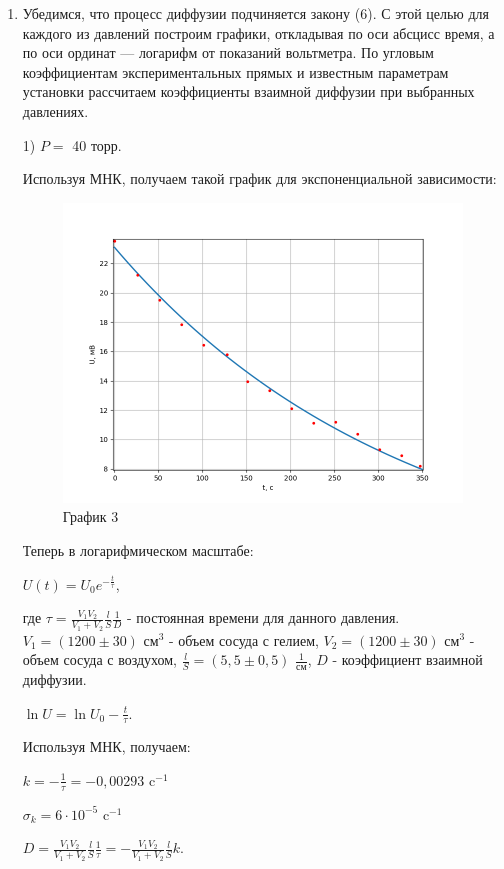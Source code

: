 \documentclass[a4paper,12pt]{article} %
\begin{document}
\begin{enumerate}
\item Убедимся, что процесс диффузии подчиняется закону (6). С этой целью для каждого из давлений построим графики, откладывая по оси абсцисс время, а по оси ординат — логарифм от показаний вольтметра. По угловым коэффициентам экспериментальных прямых и известным параметрам установки рассчитаем коэффициенты взаимной диффузии при выбранных давлениях.


1) $P = $ 40 торр.

Используя МНК, получаем такой график для экспоненциальной зависимости:
\newpage
\begin{figure}[h!]
	\centering
	\includegraphics[scale=0.8]{Pictures/График1(эксп).png}
	\caption*{График 3}
\end{figure}

Теперь в логарифмическом масштабе:

$U(t) = U_{0}e^{-\frac{t}{\tau}}$,


где $\tau = \frac{V_{1}V_{2}}{V_{1} + V_{2}}\frac{l}{S}\frac{1}{D}$ - постоянная времени для данного давления. $V_{1} = (1200\pm 30)$ см$^{3}$ - объем сосуда с гелием, $V_{2} = (1200\pm 30)$ см$^{3}$ - объем сосуда с воздухом, $\frac{l}{S} = (5,5\pm 0,5)$ $\frac{1}{\text{см}}$, $D$ - коэффициент взаимной диффузии.  
	
	
$\ln{U} = \ln{U_{0}} - \frac{t}{\tau}$.

Используя МНК, получаем:

$k = -\frac{1}{\tau} = -0,00293$ c$^{-1}$

$\sigma_{k} = 6\cdot 10^{-5}$ c$^{-1}$

$D = \frac{V_{1}V_{2}}{V_{1} + V_{2}}\frac{l}{S}\frac{1}{\tau} = - \frac{V_{1}V_{2}}{V_{1} + V_{2}}\frac{l}{S}k$.


\end{enumerate}
\end{document}
